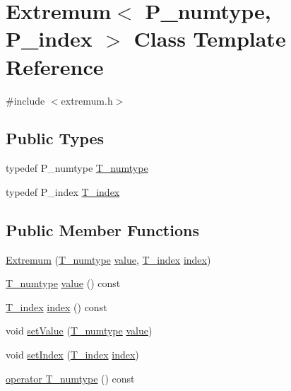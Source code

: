 \hypertarget{classExtremum}{}\section{Extremum$<$ P\+\_\+numtype, P\+\_\+index $>$ Class Template Reference}
\label{classExtremum}


{\ttfamily \#include $<$extremum.\+h$>$}

\subsection*{Public Types}
\begin{DoxyCompactItemize}
\item 
typedef P\+\_\+numtype \hyperlink{classExtremum_a305d678d8ea32a4b05f0dcb1c078b0c1}{T\+\_\+numtype}
\item 
typedef P\+\_\+index \hyperlink{classExtremum_abede57c47b4f9968a97bd2758b76589c}{T\+\_\+index}
\end{DoxyCompactItemize}
\subsection*{Public Member Functions}
\begin{DoxyCompactItemize}
\item 
\hyperlink{classExtremum_a1c4eaf1dba59d473645b87e9d7f4dff6}{Extremum} (\hyperlink{classExtremum_a305d678d8ea32a4b05f0dcb1c078b0c1}{T\+\_\+numtype} \hyperlink{classExtremum_a818cacef365e83becac1c5a5ebca7c52}{value}, \hyperlink{classExtremum_abede57c47b4f9968a97bd2758b76589c}{T\+\_\+index} \hyperlink{classExtremum_aef44a765a875c5c506c3a09517558e7f}{index})
\item 
\hyperlink{classExtremum_a305d678d8ea32a4b05f0dcb1c078b0c1}{T\+\_\+numtype} \hyperlink{classExtremum_a818cacef365e83becac1c5a5ebca7c52}{value} () const 
\item 
\hyperlink{classExtremum_abede57c47b4f9968a97bd2758b76589c}{T\+\_\+index} \hyperlink{classExtremum_aef44a765a875c5c506c3a09517558e7f}{index} () const 
\item 
void \hyperlink{classExtremum_abd03c71351bb402a8aab40fabd3df557}{set\+Value} (\hyperlink{classExtremum_a305d678d8ea32a4b05f0dcb1c078b0c1}{T\+\_\+numtype} \hyperlink{classExtremum_a818cacef365e83becac1c5a5ebca7c52}{value})
\item 
void \hyperlink{classExtremum_a7b6e93d10f67167700ab761477975fc2}{set\+Index} (\hyperlink{classExtremum_abede57c47b4f9968a97bd2758b76589c}{T\+\_\+index} \hyperlink{classExtremum_aef44a765a875c5c506c3a09517558e7f}{index})
\item 
\hyperlink{classExtremum_ae40d7535e663177f301f5cdaaf0b9d15}{operator T\+\_\+numtype} () const 
\end{DoxyCompactItemize}
